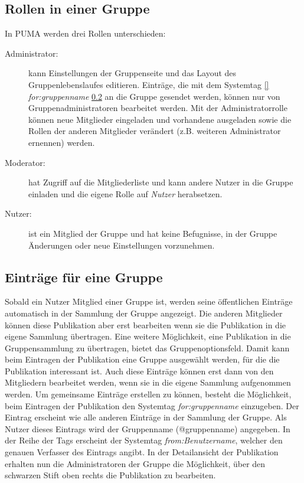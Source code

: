 \subsection{Rollen in einer Gruppe}
\label{subsec:RollenInGruppe}
In PUMA werden drei Rollen unterschieden:
\begin{description}
    \item [Administrator:] kann Einstellungen der Gruppenseite und das Layout des Gruppenlebenslaufes editieren. Einträge, die mit dem Systemtag \ref{} \textit{for:gruppenname} \ref{subsec:gruppenfunktion} an die Gruppe gesendet werden, können nur von Gruppenadministratoren bearbeitet werden. Mit der Administratorrolle können neue Mitglieder eingeladen und vorhandene ausgeladen sowie die Rollen der anderen Mitglieder verändert (z.B. weiteren Administrator ernennen) werden.
    \item [Moderator:] hat Zugriff auf die Mitgliederliste und kann andere Nutzer in die Gruppe einladen und die eigene Rolle auf \textit{Nutzer} herabsetzen.
    \item [Nutzer:] ist ein Mitglied der Gruppe und hat keine Befugnisse, in der Gruppe Änderungen oder neue Einstellungen vorzunehmen.
\end{description}

\subsection{Einträge für eine Gruppe}
\label{subsec:gruppenfunktion}
Sobald ein Nutzer Mitglied einer Gruppe ist, werden seine öffentlichen Einträge automatisch in der Sammlung der Gruppe angezeigt. Die anderen Mitglieder können diese Publikation aber erst bearbeiten wenn sie die Publikation in die eigene Sammlung übertragen. Eine weitere Möglichkeit, eine Publikation in die Gruppensammlung zu übertragen, bietet das Gruppenoptionsfeld. Damit kann beim Eintragen der Publikation eine Gruppe ausgewählt werden, für die die Publikation interessant ist. Auch diese Einträge können erst dann von den Mitgliedern bearbeitet werden, wenn sie in die eigene Sammlung aufgenommen werden.
Um gemeinsame Einträge erstellen zu können, besteht die Möglichkeit, beim Eintragen der Publikation den Systemtag \textit{for:gruppenname} einzugeben. Der Eintrag erscheint wie alle anderen Einträge in der Sammlung der Gruppe. Als Nutzer dieses Eintrags wird der Gruppenname (@gruppenname) angegeben. In der Reihe der Tags erscheint der Systemtag \textit{from:Benutzername}, welcher den genauen Verfasser des Eintrags angibt. In der Detailansicht der Publikation erhalten nun die Administratoren der Gruppe die Möglichkeit, über den schwarzen Stift oben rechts die Publikation zu bearbeiten.

